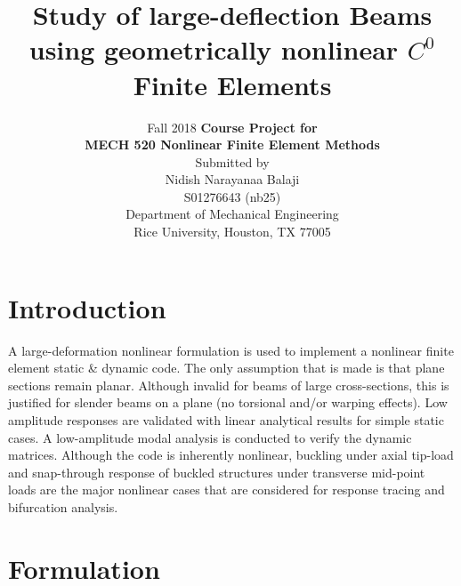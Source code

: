 \documentclass[10pt]{article}
\title{\vspace{-3cm}Study of large-deflection Beams using geometrically nonlinear
  $C^0$ Finite Elements }
\author{Fall 2018 \textbf{Course Project for}\\ \textbf{\LARGE MECH 520 Nonlinear Finite
    Element Methods}\\Submitted by\\Nidish Narayanaa Balaji\\S01276643
  (nb25)\\Department of Mechanical Engineering\\Rice University,
  Houston, TX 77005}
\begin{document}
\maketitle{}

\section{Introduction}
\label{sec:introduction}

A large-deformation nonlinear formulation is used to implement a
nonlinear finite element static \& dynamic code. The only assumption
that is made is that plane sections remain planar. Although invalid
for beams of large cross-sections, this is justified for slender beams
on a plane (no torsional and/or warping effects). Low amplitude
responses are validated with linear analytical results for simple
static cases. A low-amplitude modal analysis is conducted to verify
the dynamic matrices. Although the code is inherently nonlinear,
buckling under axial tip-load and snap-through response of buckled
structures under transverse mid-point loads are the major nonlinear
cases that are considered for response tracing and bifurcation
analysis.

\section{Formulation}
\label{sec:formulation}
\end{document}
